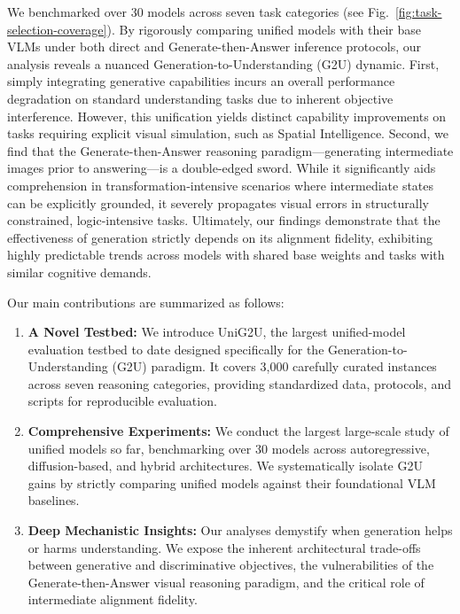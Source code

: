 \documentclass{article}
\theoremstyle{plain}
\theoremstyle{definition}
\theoremstyle{remark}
\begin{document}
We benchmarked over 30 models across seven task categories (see Fig.~\ref{fig:task-selection-coverage}). By rigorously comparing unified models with their base VLMs under both direct and Generate-then-Answer  inference protocols, our analysis reveals a nuanced Generation-to-Understanding (G2U) dynamic. First, simply integrating generative capabilities incurs an overall performance degradation on standard understanding tasks due to inherent objective interference. However, this unification yields distinct capability improvements on tasks requiring explicit visual simulation, such as Spatial Intelligence. Second, we find that the Generate-then-Answer  reasoning paradigm—generating intermediate images prior to answering—is a double-edged sword. While it significantly aids comprehension in transformation-intensive scenarios where intermediate states can be explicitly grounded, it severely propagates visual errors in structurally constrained, logic-intensive tasks. Ultimately, our findings demonstrate that the effectiveness of generation strictly depends on its alignment fidelity, exhibiting highly predictable trends across models with shared base weights and tasks with similar cognitive demands.

Our main contributions are summarized as follows:
\begin{enumerate}
    \item \textbf{A Novel Testbed:} We introduce UniG2U, the largest unified-model evaluation testbed to date designed specifically for the Generation-to-Understanding (G2U) paradigm. It covers 3,000 carefully curated instances across seven reasoning categories, providing standardized data, protocols, and scripts for reproducible evaluation.
    
    \item \textbf{Comprehensive Experiments:} We conduct the largest large-scale study of unified models so far, benchmarking over 30 models across autoregressive, diffusion-based, and hybrid architectures. We systematically isolate G2U gains by strictly comparing unified models against their foundational VLM baselines.
    
    \item \textbf{Deep Mechanistic Insights:} Our analyses demystify when generation helps or harms understanding. We expose the inherent architectural trade-offs between generative and discriminative objectives, the vulnerabilities of the Generate-then-Answer  visual reasoning paradigm, and the critical role of intermediate alignment fidelity.
\end{enumerate}
\end{document}
